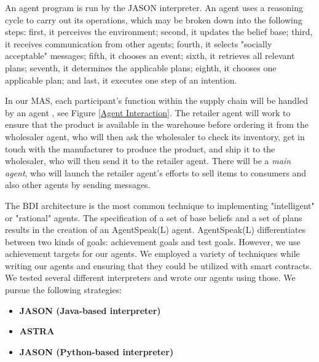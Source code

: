 An agent program is run by the JASON interpreter. An agent uses a reasoning cycle to carry out its operations, which may be broken down into the following steps: first, it perceives the environment; second, it updates the belief base; third, it receives communication from other agents; fourth, it selects "socially acceptable" messages; fifth, it chooses an event; sixth, it retrieves all relevant plans; seventh, it determines the applicable plans; eighth, it chooses one applicable plan; and last, it executes one step of an intention.

\vspace{.5cm}

In our \ac{MAS}, each participant's function within the supply chain will be handled by an agent , see Figure \ref{Agent Interaction}. The retailer agent will work to ensure that the product is available in the warehouse before ordering it from the wholesaler agent, who will then ask the wholesaler to check its inventory, get in touch with the manufacturer to produce the product, and ship it to the wholesaler, who will then send it to the retailer agent. There will be a \textit{main agent}, who will launch the retailer agent's efforts to sell items to consumers and also other agents by sending messages.

The \ac{BDI} architecture is the most common technique to implementing "intelligent" or "rational" agents. The specification of a set of base beliefs and a set of plans results in the creation of an AgentSpeak(L) agent. AgentSpeak(L) differentiates between two kinds of goals: achievement goals and test goals. However, we use achievement targets for our agents. We employed a variety of techniques while writing our agents and ensuring that they could be utilized with smart contracts. We tested several different interpreters and wrote our agents using those. We pursue the following strategies:

 \vspace{.5cm}
 
\begin{itemize}
    \item \textbf{JASON (Java-based interpreter)}
    
    \vspace{.5cm}
    
    \item \textbf{\ac{ASTRA}}
    
    \vspace{.5cm}
    
    \item \textbf{JASON (Python-based interpreter)}
    
     \vspace{.5cm}
\end{itemize}

